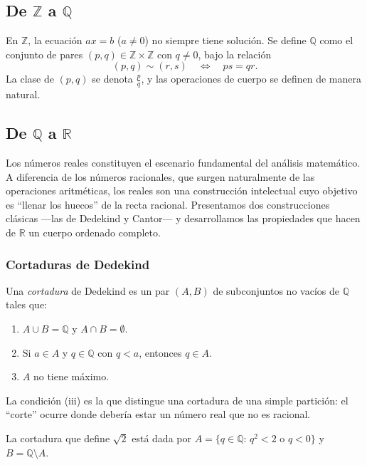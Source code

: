 \subsection{De \texorpdfstring{$\mathbb{Z}$}{Z} a \texorpdfstring{$\mathbb{Q}$}{Q}}

En $\mathbb{Z}$, la ecuación $ax=b$ ($a\neq 0$) no siempre tiene solución. Se define $\mathbb{Q}$ como el conjunto de pares $(p,q)\in\mathbb{Z}\times\mathbb{Z}$ con $q\neq 0$, bajo la relación
\[
  (p,q)\sim(r,s)\quad\Longleftrightarrow\quad ps=qr.
\]
La clase de $(p,q)$ se denota $\frac{p}{q}$, y las operaciones de cuerpo se definen de manera natural.

\subsection{De \texorpdfstring{$\mathbb{Q}$}{Q} a \texorpdfstring{$\mathbb{R}$}{R}}

Los números reales constituyen el escenario fundamental del análisis matemático. A diferencia de los números racionales, que surgen naturalmente de las operaciones aritméticas, los reales son una construcción intelectual cuyo objetivo es ``llenar los huecos'' de la recta racional. Presentamos dos construcciones clásicas ---las de Dedekind y Cantor--- y desarrollamos las propiedades que hacen de $\mathbb{R}$ un cuerpo ordenado completo.

\subsubsection{Cortaduras de Dedekind}

\begin{definition}
\label{def:cortadura}
Una \emph{cortadura} de Dedekind es un par $(A,B)$ de subconjuntos no vacíos de $\mathbb{Q}$ tales que:
\begin{enumerate}
  \item[(i)] $A\cup B=\mathbb{Q}$ y $A\cap B=\emptyset$.
  \item[(ii)] Si $a\in A$ y $q\in\mathbb{Q}$ con $q<a$, entonces $q\in A$.
  \item[(iii)] $A$ no tiene máximo.
\end{enumerate}
\end{definition}

La condición (iii) es la que distingue una cortadura de una simple partición: el ``corte'' ocurre donde debería estar un número real que no es racional.

\begin{example}
La cortadura que define $\sqrt{2}$ está dada por $A=\{q\in\mathbb{Q}:\,q^2<2\text{ o }q<0\}$ y $B=\mathbb{Q}\setminus A$.
\end{example}

